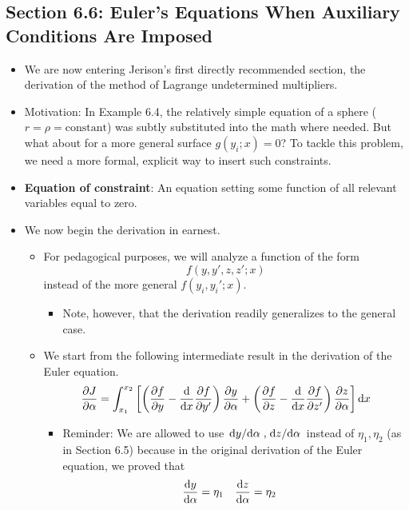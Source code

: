 \documentclass[../notes.tex]{subfiles}
\begin{document}
\subsection*{Section 6.6: Euler's Equations When Auxiliary Conditions Are Imposed}
\begin{itemize}
    \item We are now entering Jerison's first directly recommended section, the derivation of the method of Lagrange undetermined multipliers.
    \item Motivation: In Example 6.4, the relatively simple equation of a sphere ($r=\rho=\text{constant}$) was subtly substituted into the math where needed. But what about for a more general surface $g(y_i;x)=0$? To tackle this problem, we need a more formal, explicit way to insert such constraints.
    \item \textbf{Equation of constraint}: An equation setting some function of all relevant variables equal to zero.
    \item We now begin the derivation in earnest.
    \begin{itemize}
        \item For pedagogical purposes, we will analyze a function of the form
        \begin{equation*}
            f(y,y',z,z';x)
        \end{equation*}
        instead of the more general $f(y_i,y_i';x)$.
        \begin{itemize}
            \item Note, however, that the derivation readily generalizes to the general case.
        \end{itemize}
        \item We start from the following intermediate result in the derivation of the Euler equation.
        \begin{equation*}
            \pdv{J}{\alpha} = \int_{x_1}^{x_2}\left[ \left( \pdv{f}{y}-\dv{x}\pdv{f}{y'} \right)\pdv{y}{\alpha}+\left( \pdv{f}{z}-\dv{x}\pdv{f}{z'} \right)\pdv{z}{\alpha} \right]\dd{x}
        \end{equation*}
        \begin{itemize}
            \item Reminder: We are allowed to use $\dv*{y}{\alpha},\dv*{z}{\alpha}$ instead of $\eta_1,\eta_2$ (as in Section 6.5) because in the original derivation of the Euler equation, we proved that
            \begin{align*}
                \dv{y}{\alpha} &= \eta_1&
                \dv{z}{\alpha} &= \eta_2

\end{align*}
\end{itemize}
\end{itemize}
\end{itemize}
\end{document}
